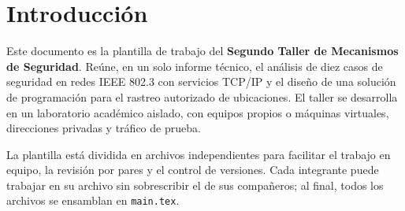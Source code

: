 \section*{Introducción}

Este documento es la plantilla de trabajo del \textbf{Segundo Taller de Mecanismos de Seguridad}. Reúne, en un solo informe técnico, el análisis de diez casos de seguridad en redes IEEE 802.3 con servicios TCP/IP y el diseño de una solución de programación para el rastreo autorizado de ubicaciones. El taller se desarrolla en un laboratorio académico aislado, con equipos propios o máquinas virtuales, direcciones privadas y tráfico de prueba.

La plantilla está dividida en archivos independientes para facilitar el trabajo en equipo, la revisión por pares y el control de versiones. Cada integrante puede trabajar en su archivo sin sobrescribir el de sus compañeros; al final, todos los archivos se ensamblan en \texttt{main.tex}.

